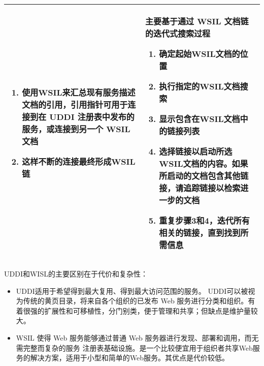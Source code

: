 \begin{solution}
\begin{spacing}{1.2}
\begin{longtable}{|m{7.5cm}|m{7.5cm}|}
\begin{enumerate}[label=\arabic*.,leftmargin=1.5em,itemsep=-3pt]
            \item 使用WSIL来汇总现有服务描述文档的引用，引用指针可用于连接到在 UDDI 注册表中发布的服务，或连接到另一个 WSIL 文档
            \item 这样不断的连接最终形成WSIL链
        \vspace{-1.3em}
        \end{enumerate}                                           
        & 
        主要基于通过 WSIL 文档链的迭代式搜索过程
        \begin{enumerate}[label=\arabic*.,leftmargin=1.5em,itemsep=-3pt]
            \item 确定起始WSIL文档的位置
            \item 执行指定的WSIL文档搜索
            \item 显示包含在WSIL文档中的链接列表
            \item 选择链接以启动所选WSIL文档的内容。如果所启动的文档包含其他链接，请追踪链接以检索进一步的文档
            \item 重复步骤3和4，迭代所有相关的链接，直到找到所需信息
        \vspace{-1.3em}
        \end{enumerate}  
        \\ \hline
    \end{longtable}
    \vspace{-1em}
\end{spacing}

UDDI和WISL的主要区别在于代价和复杂性：
\begin{itemize}
    \item UDDI适用于希望得到最大复用、得到最大访问范围的服务。 UDDI可以被视为传统的黄页目录，将来自各个组织的已发布 Web 服务进行分类和组织。有着很强的扩展性和可移植性，分门别类，便于管理和共享；但缺点是维护量较大。
    \item WSIL 使得 Web 服务能够通过普通 Web 服务器进行发现、部署和调用，而无需完整而复杂的服务 注册表基础设施。是一个比较便宜用于组织者共享Web服务的解决方案，适用于小型和简单的Web服务。其优点是代价较低。
\end{itemize}

\end{solution}
